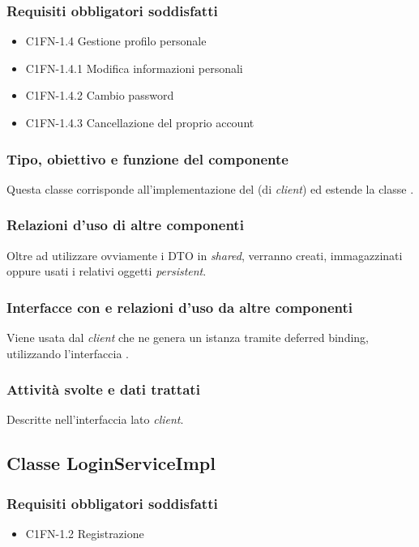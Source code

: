 \subsubsection*{Requisiti obbligatori soddisfatti}
\begin{itemize}
	\item C1FN-1.4 Gestione profilo personale
	\item C1FN-1.4.1 Modifica informazioni personali
	\item C1FN-1.4.2 Cambio password
	\item C1FN-1.4.3 Cancellazione del proprio account
\end{itemize}
\subsubsection*{Tipo, obiettivo e funzione del componente}
Questa classe corrisponde all'implementazione del  (di
\emph{client}) ed estende la classe .

\subsubsection*{Relazioni d'uso di altre componenti}
Oltre ad utilizzare ovviamente i DTO in \emph{shared}, verranno creati,
immagazzinati oppure usati i relativi oggetti \emph{persistent}.

\subsubsection*{Interfacce con e relazioni d'uso da altre componenti}
Viene usata dal \emph{client} che ne genera un istanza tramite deferred binding,
utilizzando l'interfaccia .

\subsubsection*{Attivit\`a svolte e dati trattati}
Descritte nell'interfaccia lato \emph{client}.

\subsection{Classe LoginServiceImpl}
\subsubsection*{Requisiti obbligatori soddisfatti}
\begin{itemize}
	\item C1FN-1.2 Registrazione
\end{itemize}

